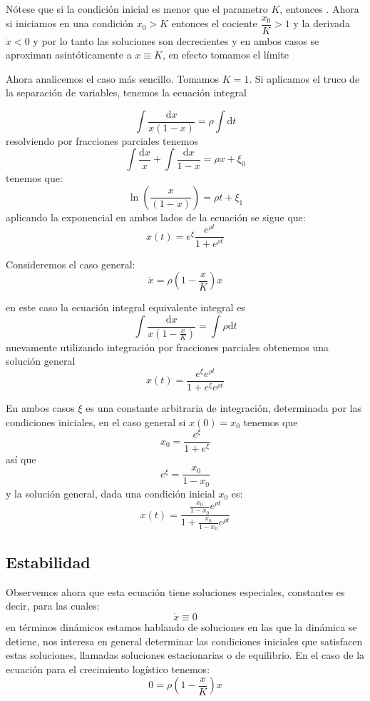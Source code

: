 Nótese que si la condición inicial es menor que el parametro $K$, entonces . Ahora si iniciamos en una condición $x_0 > K$ entonces el cociente $\dfrac{x_0}{K}>1$ y la derivada $\dot{x} < 0$ y por lo tanto las soluciones son decrecientes y en ambos casos se aproximan asintóticamente a $x\equiv K$, en efecto tomamos el límite

Ahora analicemos el caso más sencillo. Tomamos $K=1$. Si aplicamos el truco de la separación de variables, tenemos la ecuación integral

\begin{equation}
    \int \frac{\mathrm{d}x}{x(1-x)}=\rho\int\mathrm{d}t
\end{equation}
resolviendo por fracciones parciales tenemos
$$
\int\frac{\mathrm{d}x}{x}+\int\frac{\mathrm{d}x}{1-x}=\rho x +\xi_0
$$
tenemos que:
$$
\ln\left(\frac{x}{(1-x)}\right)=\rho t+\xi_1
$$
aplicando la exponencial en ambos lados de la ecuación se sigue que:
$$
x(t)=e^\xi\frac{e^{\rho t}}{1+e^{\rho t}}
$$

Consideremos el caso general:
$$
    \dot{x}=\rho(1-\frac{x}{K})x
$$

en este caso la  ecuación integral equivalente integral es 
$$
\int \dfrac{\mathrm{d}x}{x(1-\frac{x}{K})}=\int\rho \mathrm{d}t
$$
nuevamente utilizando integración por fracciones parciales obtenemos una solución general
$$
x(t)=\frac{e^\xi e^{\rho t}}{1+e^\xi e^{\rho t}} 
$$

En ambos casos $\xi$ es una constante arbitraria de integración, determinada por las condiciones iniciales, en el caso general si $x(0)=x_0$ tenemos que
$$
x_0=\dfrac{e^{\xi}}{1+e^{\xi}}
$$
así que
$$
e^{\xi}=\dfrac{x_0}{1-x_0}
$$
y la solución general, dada una condición inicial $x_0$  es:
$$
x(t)=\frac{\frac{x_0}{1-x_0} e^{\rho t}}{1+\frac{x_0}{1-x_0} e^{\rho t}}
$$

\subsection{Estabilidad}

Observemos ahora que esta ecuación tiene soluciones especiales, constantes es decir, para las cuales:
$$
\dot{x}\equiv 0
$$
en términos dinámicos estamos hablando de soluciones en las que la dinámica se detiene, nos interesa en general determinar las condiciones iniciales que satisfacen estas soluciones, llamadas soluciones estacionarias o de equilibrio. En el caso de la ecuación para el crecimiento logístico tenemos:
$$
    0=\rho(1-\frac{x}{K})x
$$

